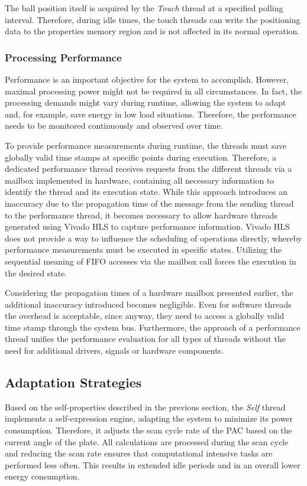 The ball position itself is acquired by the \emph{Touch} thread at a specified
polling interval. Therefore, during idle times, the touch threads can write
the positioning data to the properties memory region and is not affected in
its normal operation.

\subsubsection{Processing Performance}
\label{sssec:processing}
Performance is an important objective for the system to accomplish. However,
maximal processing power might not be required in all circumstances. In fact,
the processing demands might vary during runtime, allowing the system to adapt
and, for example, save energy in low load situations. Therefore, the
performance needs to be monitored continuously and observed over time.

To provide performance measurements during runtime, the threads must save
globally valid time stamps at specific points during execution. Therefore, a
dedicated performance thread receives requests from the different threads via
a mailbox implemented in hardware, containing all necessary information to
identify the thread and its execution state. While this approach introduces an
inaccuracy due to the propagation time of the message from the sending thread
to the performance thread, it becomes necessary to allow hardware threads
generated using Vivado HLS to capture performance information. Vivado HLS does
not provide a way to influence the scheduling of operations directly, whereby
performance measurements must be executed in specific states. Utilizing the
sequential meaning of \ac{FIFO} accesses via the mailbox call forces the
execution in the desired state.

Considering the propagation times of a hardware mailbox presented earlier, the
additional inaccuracy introduced becomes negligible. Even for software threads
the overhead is acceptable, since anyway, they need to access a globally valid
time stamp through the system bus. Furthermore, the approach of a performance
thread unifies the performance evaluation for all types of threads without the
need for additional drivers, signals or hardware components.

\subsection{Adaptation Strategies}
Based on the self-properties described in the previous section, the
\emph{Self} thread implements a self-expression engine, adapting the system to
minimize its power consumption. Therefore, it adjusts the scan cycle rate of
the \ac{PAC} based on the current angle of the plate. All calculations are
processed during the scan cycle and reducing the scan rate ensures that
computational intensive tasks are performed less often. This results in
extended idle periods and in an overall lower energy consumption.

